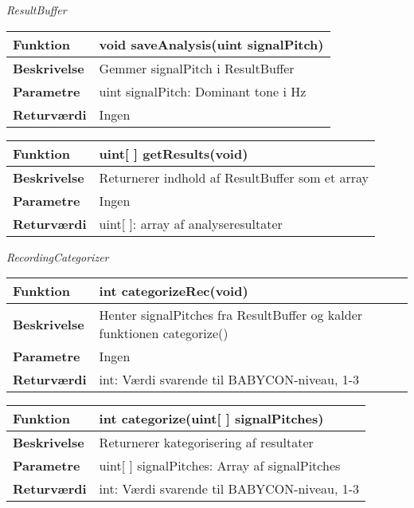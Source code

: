 \textit{ResultBuffer} \\
\begin{center}
    \begin{tabular}{ | l | p{10cm} |}
    \hline
    \textbf{Funktion}	 	& void saveAnalysis(uint signalPitch)								\\ \hline
    \textbf{Beskrivelse} 	& Gemmer signalPitch i ResultBuffer									\\ \hline
    \textbf{Parametre}		& uint signalPitch: Dominant tone i Hz		 					    \\ \hline
    \textbf{Returværdi} 	& Ingen																\\ \hline
    \end{tabular}
\end{center}

\begin{center}
    \begin{tabular}{ | l | p{10cm} |}
    \hline
    \textbf{Funktion}	 	& uint[ ] getResults(void)								\\ \hline
    \textbf{Beskrivelse} 	& Returnerer indhold af ResultBuffer som et array		\\ \hline
    \textbf{Parametre}		& Ingen							 					    \\ \hline
    \textbf{Returværdi} 	& uint[ ]: array af analyseresultater 					\\ \hline
    \end{tabular}
\end{center}

\textit{RecordingCategorizer} \\
\begin{center}
    \begin{tabular}{ | l | p{10cm} |}
    \hline
    \textbf{Funktion}	 	& int categorizeRec(void)								\\ \hline
    \textbf{Beskrivelse} 	& Henter signalPitches fra ResultBuffer og kalder funktionen categorize()					\\ \hline
    \textbf{Parametre}		& Ingen							 					    \\ \hline
    \textbf{Returværdi} 	& int: Værdi svarende til BABYCON-niveau, 1-3			\\ \hline
    \end{tabular}
\end{center}

\begin{center}
    \begin{tabular}{ | l | p{10cm} |}
    \hline
    \textbf{Funktion}	 	& int categorize(uint[ ] signalPitches)								\\ \hline
    \textbf{Beskrivelse} 	& Returnerer kategorisering af resultater				\\ \hline
    \textbf{Parametre}		& uint[ ] signalPitches: Array af signalPitches							 					    \\ \hline
    \textbf{Returværdi} 	& int: Værdi svarende til BABYCON-niveau, 1-3			\\ \hline
    \end{tabular}
\end{center}

